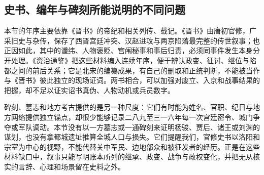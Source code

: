 \subsection{史书、编年与碑刻所能说明的不同问题}

本节的年序主要依靠《晋书》的帝纪和相关列传、载记。《晋书》由唐初官修，广采旧史与杂传，保存了西晋宫廷冲突、汉赵进攻与两京陷落最完整的传世叙事；也正因如此，其中的谶纬、人物褒贬、宫闱秘事和事后归责，必须同事件发生本身分开处理。《资治通鉴》把这些材料编入连续年序，便于辨认政变、征讨、继位与陷都之间的前后关系；它是北宋的编纂成果，有自己的删取和正统判断，不能被当作与《晋书》彼此独立的现场证词。两书相合，可以加强对废立、入京和战事结果的把握，却不足以证实诏书真伪、人物动机或兵员数字。

碑刻、墓志和地方考古提供的是另一种尺度：它们有时能为姓名、官职、纪日与地方网络提供独立锚点，却很少能够记录二八九至三一六年每一次宫廷密令、城门争夺或军队调动。本节没有以一方墓志或一通碑刻来证明杨骏、贾后、诸王或刘渊的谋划，也没有拿都城遗址推算全城人口与损失。它们提醒我们，官修史书以洛阳和宗室为中心的视野，不能代替关中军民、边地部众和被征发者的经历。正是在这些材料缺口中，叙事只能写明账本所列的继承、政变、战争与政权变化，并把无从核实的言辞、心理和场景留在史料之外。
